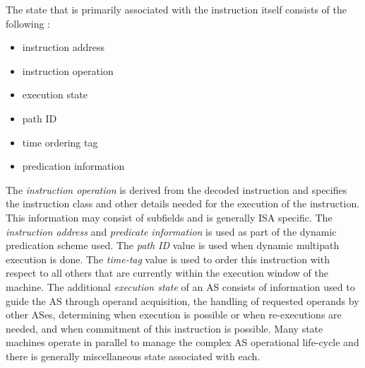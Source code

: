 \documentclass{book}
\begin{document}
The state that is primarily associated with the instruction itself
consists of the following :
%
\begin{itemize}
\vspace{-0.10in}
\item{instruction address}
\vspace{-0.10in}
\item{instruction operation}
\vspace{-0.10in}
\item{execution state}
\vspace{-0.10in}
\item{path ID}
\vspace{-0.10in}
\item{time ordering tag}
\vspace{-0.10in}
\item{predication information}
\vspace{-0.10in}
\end{itemize}   
%
The \textit{instruction operation} is derived from the decoded
instruction and specifies the instruction class and other
details needed for the execution of the instruction.
This information may consist of subfields and is generally ISA
specific.
The \textit{instruction address} and \textit{predicate information}
is used as part of the dynamic predication 
scheme used. \cite{morano02predication}
The \textit{path ID} value is used when dynamic multipath
execution is done.
The \textit{time-tag} value is used to order this instruction
with respect to all others that are currently within the execution
window of the machine.
The additional \textit{execution state} of an AS
consists of information used to guide the AS through
operand acquisition, the handling of requested operands by other
ASes, determining when execution is possible or when re-executions
are needed, and when commitment of this instruction is possible.
Many state machines operate in parallel to manage the complex
AS operational life-cycle and there is generally 
miscellaneous state associated with each.
\end{document}
